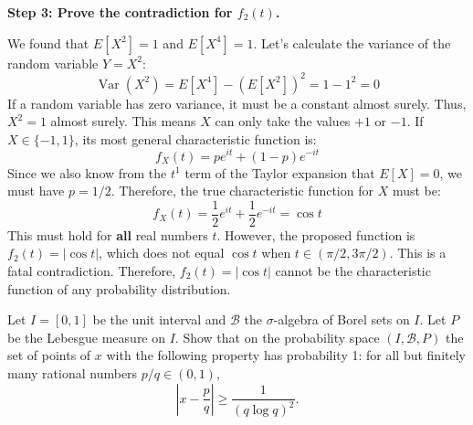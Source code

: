 \begin{solution}
\textbf{Step 3: Prove the contradiction for $f_2(t)$.}

We found that $E[X^2] = 1$ and $E[X^4] = 1$.
Let's calculate the variance of the random variable $Y = X^2$:
\[ \operatorname{Var}(X^2) = E[X^4] - (E[X^2])^2 = 1 - 1^2 = 0 \]
If a random variable has zero variance, it must be a constant almost surely. Thus, $X^2 = 1$ almost surely.
This means $X$ can only take the values $+1$ or $-1$.
If $X \in \{-1, 1\}$, its most general characteristic function is:
\[ f_X(t) = p e^{it} + (1-p) e^{-it} \]
Since we also know from the $t^1$ term of the Taylor expansion that $E[X] = 0$, we must have $p = 1/2$.
Therefore, the true characteristic function for $X$ must be:
\[ f_X(t) = \frac{1}{2}e^{it} + \frac{1}{2}e^{-it} = \cos t \]
This must hold for \textbf{all} real numbers $t$.
However, the proposed function is $f_2(t) = |\cos t|$, which does not equal $\cos t$ when $t \in (\pi/2, 3\pi/2)$.
This is a fatal contradiction. Therefore, $f_2(t) = |\cos t|$ cannot be the characteristic function of any probability distribution.
\end{solution}

\begin{exercise}
\label{probability:2013:8}
Let $I = [0, 1]$ be the unit interval and $\mathcal{B}$ the $\sigma$-algebra of Borel sets on $I$. Let $P$ be the Lebesgue measure on $I$. Show that on the probability space $(I, \mathcal{B}, P)$ the set of points of $x$ with the following property has probability 1: for all but finitely many rational numbers $p/q \in (0, 1)$,
\[ \left| x - \frac{p}{q} \right| \geq \frac{1}{(q \log q)^2}. \]
\end{exercise}


